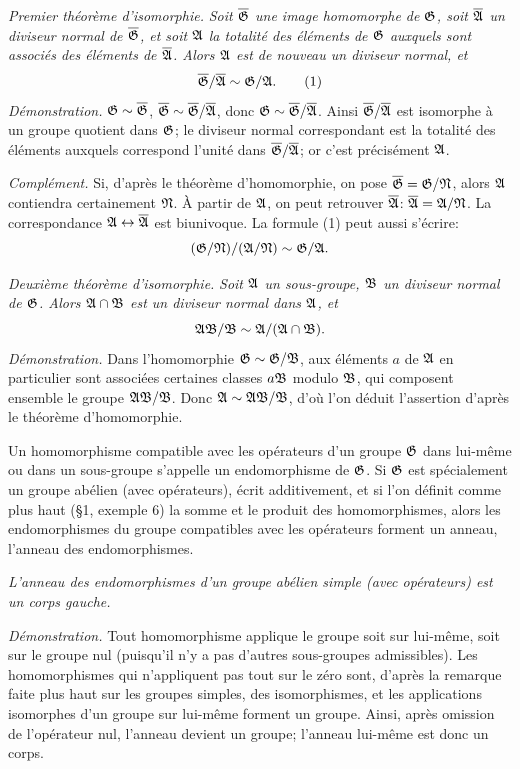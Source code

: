 \emph{Premier théorème d'isomorphie.} \emph{Soit $\overline{\mathfrak{G}}$ une image homomorphe de $\mathfrak{G}$, soit $\overline{\mathfrak{A}}$ un diviseur normal de $\overline{\mathfrak{G}}$, et soit $\mathfrak{A}$ la totalité des éléments de $\mathfrak{G}$ auxquels sont associés des éléments de $\overline{\mathfrak{A}}$. Alors $\mathfrak{A}$ est de nouveau un diviseur normal, et}
\[
        \overline{\mathfrak{G}}/\overline{\mathfrak{A}}\sim \mathfrak{G}/\mathfrak{A}. \tag{1}
\]
\emph{Démonstration.} $\mathfrak{G}\sim\overline{\mathfrak{G}}$, $\overline{\mathfrak{G}}\sim\overline{\mathfrak{G}}/\overline{\mathfrak{A}}$, donc $\mathfrak{G}\sim\overline{\mathfrak{G}}/\overline{\mathfrak{A}}$. Ainsi $\overline{\mathfrak{G}}/\overline{\mathfrak{A}}$ est isomorphe à un groupe quotient dans $\mathfrak{G}$; le diviseur normal correspondant est la totalité des éléments auxquels correspond l'unité dans $\overline{\mathfrak{G}}/\overline{\mathfrak{A}}$; or c'est précisément $\mathfrak{A}$.

\emph{Complément.} Si, d'après le théorème d'homomorphie, on pose $\overline{\mathfrak{G}}=\mathfrak{G}/\mathfrak{N}$, alors $\mathfrak{A}$ contiendra certainement $\mathfrak{N}$. À partir de $\mathfrak{A}$, on peut retrouver $\overline{\mathfrak{A}}$: $\overline{\mathfrak{A}}=\mathfrak{A}/\mathfrak{N}$. La correspondance $\mathfrak{A}\leftrightarrow\overline{\mathfrak{A}}$ est biunivoque. La formule (1) peut aussi s'écrire:
\[
        (\mathfrak{G}/\mathfrak{N})/(\mathfrak{A}/\mathfrak{N})\sim \mathfrak{G}/\mathfrak{A}.
\]

\emph{Deuxième théorème d'isomorphie.} \emph{Soit $\mathfrak{A}$ un sous-groupe, $\mathfrak{B}$ un diviseur normal de $\mathfrak{G}$. Alors $\mathfrak{A}\cap\mathfrak{B}$ est un diviseur normal dans $\mathfrak{A}$, et}
\[
        \mathfrak{A}\mathfrak{B}/\mathfrak{B}\sim \mathfrak{A}/(\mathfrak{A}\cap\mathfrak{B}).
\]
\emph{Démonstration.} Dans l'homomorphie $\mathfrak{G}\sim\mathfrak{G}/\mathfrak{B}$, aux éléments $a$ de $\mathfrak{A}$ en particulier sont associées certaines classes $a\mathfrak{B}$ modulo $\mathfrak{B}$, qui composent ensemble le groupe $\mathfrak{A}\mathfrak{B}/\mathfrak{B}$. Donc $\mathfrak{A}\sim\mathfrak{A}\mathfrak{B}/\mathfrak{B}$, d'où l'on déduit l'assertion d'après le théorème d'homomorphie.

Un homomorphisme compatible avec les opérateurs d'un groupe $\mathfrak{G}$ dans lui-même ou dans un sous-groupe s'appelle un endomorphisme de $\mathfrak{G}$. Si $\mathfrak{G}$ est spécialement un groupe abélien (avec opérateurs), écrit additivement, et si l'on définit comme plus haut (\S{}1, exemple 6) la somme et le produit des homomorphismes, alors les endomorphismes du groupe compatibles avec les opérateurs forment un anneau, l'anneau des endomorphismes.

\emph{L'anneau des endomorphismes d'un groupe abélien simple (avec opérateurs) est un corps gauche.}

\emph{Démonstration.} Tout homomorphisme applique le groupe soit sur lui-même, soit sur le groupe nul (puisqu'il n'y a pas d'autres sous-groupes admissibles). Les homomorphismes qui n'appliquent pas tout sur le zéro sont, d'après la remarque faite plus haut sur les groupes simples, des isomorphismes, et les applications isomorphes d'un groupe sur lui-même forment un groupe. Ainsi, après omission de l'opérateur nul, l'anneau devient un groupe; l'anneau lui-même est donc un corps.

